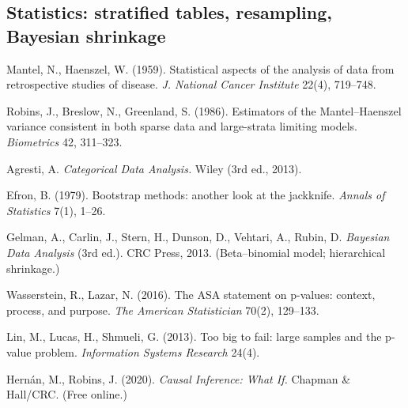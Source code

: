 \documentclass[11pt,a4paper]{article}
\begin{document}
\subsection*{Statistics: stratified tables, resampling, Bayesian shrinkage}
\begin{enumerate}[label={[\arabic*]},ref=\arabic*,resume=refs]
  \item\label{ref:mh} Mantel, N., Haenszel, W. (1959). Statistical aspects of the analysis of data from retrospective studies of disease. \emph{J. National Cancer Institute} 22(4), 719--748.
  \item\label{ref:rbg} Robins, J., Breslow, N., Greenland, S. (1986). Estimators of the Mantel--Haenszel variance consistent in both sparse data and large-strata limiting models. \emph{Biometrics} 42, 311--323.
  \item\label{ref:agresti} Agresti, A. \emph{Categorical Data Analysis.} Wiley (3rd ed., 2013).
  \item\label{ref:efron} Efron, B. (1979). Bootstrap methods: another look at the jackknife. \emph{Annals of Statistics} 7(1), 1--26.
  \item\label{ref:bda} Gelman, A., Carlin, J., Stern, H., Dunson, D., Vehtari, A., Rubin, D. \emph{Bayesian Data Analysis} (3rd ed.). CRC Press, 2013. (Beta--binomial model; hierarchical shrinkage.)
  \item\label{ref:wasserstein} Wasserstein, R., Lazar, N. (2016). The ASA statement on p-values: context, process, and purpose. \emph{The American Statistician} 70(2), 129--133.
  \item\label{ref:lin} Lin, M., Lucas, H., Shmueli, G. (2013). Too big to fail: large samples and the p-value problem. \emph{Information Systems Research} 24(4).
  \item\label{ref:hernan} Hern\'an, M., Robins, J. (2020). \emph{Causal Inference: What If.} Chapman \& Hall/CRC. (Free online.)
\end{enumerate}
\end{document}
